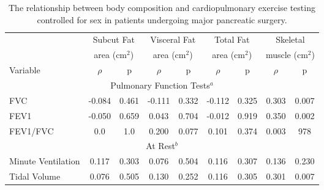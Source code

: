 \begin{table}[p]
	\caption{The relationship between body composition and cardiopulmonary exercise testing controlled for sex in patients undergoing major pancreatic surgery.}
	\label{table:bc_cpet}
	\footnotesize
	\centering
	\renewcommand{\arraystretch}{1.5} %
	\begin{tabular}{|l| c c | c c | c c | c c|}
		\hline
		                          &  \multicolumn{2}{c|}{Subcut Fat}   & \multicolumn{2}{c|}{Visceral Fat}  &   \multicolumn{2}{c|}{Total Fat}   &    \multicolumn{2}{c|}{Skeletal}     \\
		                          & \multicolumn{2}{c|}{area (cm$^2$)} & \multicolumn{2}{c|}{area (cm$^2$)} & \multicolumn{2}{c|}{area (cm$^2$)} & \multicolumn{2}{c|}{muscle (cm$^2$)} \\
		Variable                  & $\rho$ & p                         & $\rho$ & p                         & $\rho$ & p                         & $\rho$ & p                           \\ \hline
		\multicolumn{9}{|c|}{Pulmonary Function Tests$^a$}                                                                                                                              \\ \hline
		FVC                       & -0.084 & 0.461                     & -0.111 & 0.332                     & -0.112 & 0.325                     & 0.303  & 0.007                       \\
		FEV1                      & -0.050 & 0.659                     & 0.043  & 0.704                     & -0.012 & 0.919                     & 0.350  & 0.002                       \\
		FEV1/FVC                  & 0.0    & 1.0                       & 0.200  & 0.077                     & 0.101  & 0.374                     & 0.003  & 978                         \\ \hline
		\multicolumn{9}{|c|}{At Rest$^b$}                                                                                                                                               \\ \hline
		Minute Ventilation        & 0.117  & 0.303                     & 0.076  & 0.504                     & 0.116  & 0.307                     & 0.136  & 0.230                       \\
		Tidal Volume              & 0.076  & 0.505                     & 0.130  & 0.252                     & 0.116  & 0.305                     & 0.301  & 0.007                       \\

\end{tabular}
\end{table}
